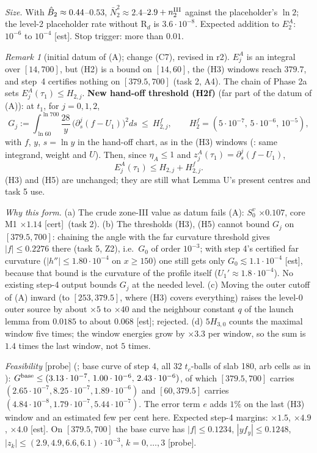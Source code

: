 \documentclass[11pt]{article}
\theoremstyle{definition}\newtheorem{definition}[theorem]{Definition}
\theoremstyle{remark}\newtheorem{remark}[theorem]{Remark}
\newcommand{\fn}[1]{\texttt{\detokenize{#1}}}
\newcommand{\tC}{\textup{[cert]}}\newcommand{\tE}{\textup{[est]}}\newcommand{\tP}{\textup{[paper]}}\newcommand{\tR}{\textup{[rev]}}
\newcommand{\Nb}{\bar N}\newcommand{\oh}{\hat o}
\begin{document}
\noindent\emph{Size.} With $\hat B_2\approx0.44$--$0.53$, $\Nb_2^2\approx2.4$--$2.9+n^{\rm III}_2$ against the placeholder's $\ln2$; the level-2 placeholder rate without R$_d$ is $3.6\cdot10^{-8}$. Expected addition to $E_2^A$: $10^{-6}$ to $10^{-4}$ \tE. Stop trigger: more than $0.01$.
\begin{remark}[initial datum of (A); change (C7), revised in r2]\label{rem:IC}
$E^A_j$ is an integral over $[14,700]$, but (H2) is a bound on $[14,60]$, the (H3) windows reach $379.7$, and step~4 certifies nothing on $[379.5,700]$ (task 2, A4). The chain of Phase 2a sets $E^A_j(\tau_1)\le H_{2,j}$. \textbf{New hand-off threshold \textup{(H2f)}} (far part of the datum of (A)): at $t_1$, for $j=0,1,2$,
\[
G_j:=\int_{\ln60}^{\ln700}\frac{28}{y}\,\bigl(\partial_s^j(f-U_1)\bigr)^2ds\ \le\ H^f_{2,j},\qquad H^f_2=(5\cdot10^{-7},\,5\cdot10^{-6},\,10^{-5}),
\]
with $f$, $y$, $s=\ln y$ in the hand-off chart, as in the (H3) windows (\fn{t9h/win.py}: same integrand, weight and $U$). Then, since $\eta_A\le1$ and $z^A_j(\tau_1)=\partial_s^j(f-U_1)$,
\[
E^A_j(\tau_1)\le H_{2,j}+H^f_{2,j}.
\]
(H3) and (H5) are unchanged; they are still what Lemma U's present centres and task 5 use.

\noindent\emph{Why this form.} (a) The crude zone-III value as datum fails (A): $S_0^v$ $\times0.107$, core M1 $\times1.14$ \tC\ (task 2). (b) The thresholds (H3), (H5) cannot bound $G_j$ on $[379.5,700]$: chaining the angle with the far curvature threshold gives $|f|\le0.2276$ there (task 5, Z2), i.e.\ $G_0$ of order $10^{-3}$; with step 4's certified far curvature ($|h''|\le1.80\cdot10^{-4}$ on $x\ge150$) one still gets only $G_0\lesssim1.1\cdot10^{-4}$ \tE, because that bound is the curvature of the profile itself ($U_1'\approx1.8\cdot10^{-4}$). No existing step-4 output bounds $G_j$ at the needed level. (c) Moving the outer cutoff of (A) inward (to $[253,379.5]$, where (H3) covers everything) raises the level-0 outer source by about $\times5$ to $\times40$ and the neighbour constant $q$ of the launch lemma from $0.0185$ to about $0.068$ \tE; rejected. (d) $5H_{3,0}$ counts the maximal window five times; the window energies grow by $\times3.3$ per window, so the sum is $1.4$ times the last window, not $5$ times.

\noindent\emph{Feasibility} \textup{[probe]} (\fn{r2_probe/}; base curve of step 4, all 32 $t_c$-balls of slab 180, arb cells as in \fn{win.py}): $G^{\rm base}\le(3.13\cdot10^{-7},\,1.00\cdot10^{-6},\,2.43\cdot10^{-6})$, of which $[379.5,700]$ carries $(2.65\cdot10^{-7},8.25\cdot10^{-7},1.89\cdot10^{-6})$ and $[60,379.5]$ carries $(4.84\cdot10^{-8},1.79\cdot10^{-7},5.44\cdot10^{-7})$. The error term $e$ adds $1\%$ on the last (H3) window and an estimated few per cent here. Expected step-4 margins: $\times1.5$, $\times4.9$, $\times4.0$ \tE. On $[379.5,700]$ the base curve has $|f|\le0.1234$, $|yf_y|\le0.1248$, $|z_k|\le(2.9,4.9,6.6,6.1)\cdot10^{-3}$, $k=0,\dots,3$ \textup{[probe]}.


\end{remark}
\end{document}
